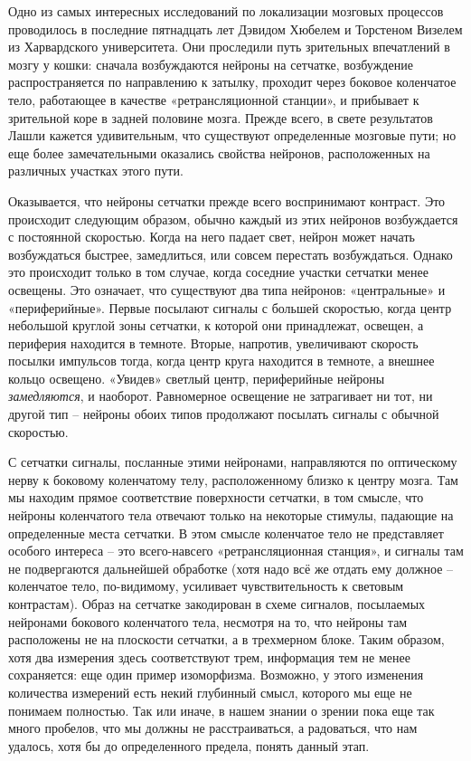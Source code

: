 \documentclass[../main.tex]{subfiles}
\begin{document}
Одно из самых интересных исследований по локализации мозговых процессов проводилось в последние пятнадцать лет Дэвидом Хюбелем и Торстеном Визелем из Харвардского университета. Они проследили путь зрительных впечатлений в мозгу у кошки: сначала возбуждаются нейроны на сетчатке, возбуждение распространяется по направлению к затылку, проходит через боковое коленчатое тело, работающее в качестве «ретрансляционной станции», и прибывает к зрительной коре в задней половине мозга. Прежде всего, в свете результатов Лашли кажется удивительным, что существуют определенные мозговые пути; но еще более замечательными оказались свойства нейронов, расположенных на различных участках этого пути.

Оказывается, что нейроны сетчатки прежде всего воспринимают контраст. Это происходит следующим образом, обычно каждый из этих нейронов возбуждается с постоянной скоростью. Когда на него падает свет, нейрон может начать возбуждаться быстрее, замедлиться, или совсем перестать возбуждаться. Однако это происходит только в том случае, когда соседние участки сетчатки менее освещены. Это означает, что существуют два типа нейронов: «центральные» и «периферийные». Первые посылают сигналы с большей скоростью, когда центр небольшой круглой зоны сетчатки, к которой они принадлежат, освещен, а периферия находится в темноте. Вторые, напротив, увеличивают скорость посылки импульсов тогда, когда центр круга находится в темноте, а внешнее кольцо освещено. «Увидев» светлый центр, периферийные нейроны \emph{замедляются}, и наоборот. Равномерное освещение не затрагивает ни тот, ни другой тип \--- нейроны обоих типов продолжают посылать сигналы с обычной скоростью.

С сетчатки сигналы, посланные этими нейронами, направляются по оптическому нерву к боковому коленчатому телу, расположенному близко к центру мозга. Там мы находим прямое соответствие поверхности сетчатки, в том смысле, что нейроны коленчатого тела отвечают только на некоторые стимулы, падающие на определенные места сетчатки. В этом смысле коленчатое тело не представляет особого интереса \--- это всего-навсего «ретрансляционная станция», и сигналы там не подвергаются дальнейшей обработке (хотя надо всё же отдать ему должное \--- коленчатое тело, по-видимому, усиливает чувствительность к световым контрастам). Образ на сетчатке закодирован в схеме сигналов, посылаемых нейронами бокового коленчатого тела, несмотря на то, что нейроны там расположены не на плоскости сетчатки, а в трехмерном блоке. Таким образом, хотя два измерения здесь соответствуют трем, информация тем не менее сохраняется: еще один пример изоморфизма. Возможно, у этого изменения количества измерений есть некий глубинный смысл, которого мы еще не понимаем полностью. Так или иначе, в нашем знании о зрении пока еще так много пробелов, что мы должны не расстраиваться, а радоваться, что нам удалось, хотя бы до определенного предела, понять данный этап.
\end{document}
